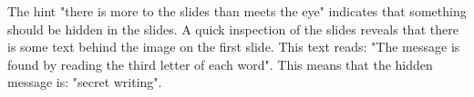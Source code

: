 The hint "there is more to the slides than meets the eye" indicates that something should be hidden in the slides. A quick inspection of the slides reveals that there is some text behind the image on the first slide. This text reads: "The message is found by reading the third letter of each word". This means that the hidden message is: "secret writing".